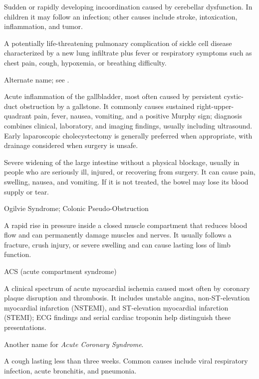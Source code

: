  Sudden or rapidly developing incoordination caused by cerebellar dysfunction. In children it may follow an infection; other causes include stroke, intoxication, inflammation, and tumor.

 A potentially life-threatening pulmonary complication of sickle cell disease characterized by a new lung infiltrate plus fever or respiratory symptoms such as chest pain, cough, hypoxemia, or breathing difficulty.

 Alternate name; see .

 Acute inflammation of the gallbladder, most often caused by persistent cystic-duct
obstruction by a gallstone. It commonly causes sustained right-upper-quadrant pain,
fever, nausea, vomiting, and a positive Murphy sign; diagnosis combines clinical,
laboratory, and imaging findings, usually including ultrasound. Early laparoscopic
cholecystectomy is generally preferred when appropriate, with drainage considered
when surgery is unsafe.

 Severe widening of the large intestine without a physical blockage, usually in people who are seriously ill, injured, or recovering from surgery. It can cause pain, swelling, nausea, and vomiting. If it is not treated, the bowel may lose its blood supply or tear.

\synonyms
Ogilvie Syndrome; Colonic Pseudo-Obstruction

 A rapid rise in pressure inside a closed muscle compartment that reduces blood flow and can permanently damage muscles and nerves. It usually follows a fracture, crush injury, or severe swelling and can cause lasting loss of limb function.

\synonyms
ACS (acute compartment syndrome)

 A clinical spectrum of acute myocardial ischemia caused most often by coronary plaque disruption and thrombosis. It includes unstable angina, non-ST-elevation myocardial infarction (NSTEMI), and ST-elevation myocardial infarction (STEMI); ECG findings and serial cardiac troponin help distinguish these presentations.

 Another name for \textit{Acute Coronary Syndrome}.

 A cough lasting less than three weeks. Common causes include viral respiratory infection, acute bronchitis, and pneumonia.

